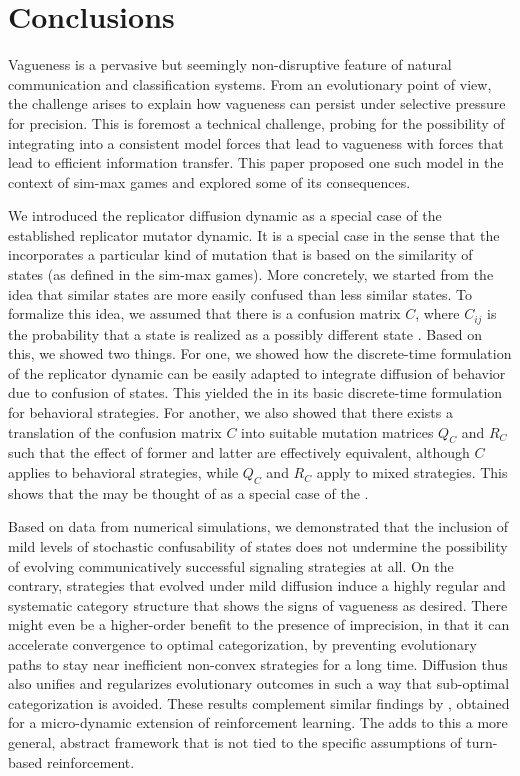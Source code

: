 \section{Conclusions}
\label{sec:conclusions}

Vagueness is a pervasive but seemingly non-disruptive feature of
natural communication and classification systems. From an evolutionary
point of view, the challenge arises to explain how vagueness can
persist under selective pressure for precision. This is foremost a
technical challenge, probing for the possibility of integrating into a
consistent model forces that lead to vagueness with forces that lead
to efficient information transfer. This paper proposed one such model
in the context of sim-max games and explored some of its consequences.

We introduced the replicator diffusion dynamic as a special case of
the established replicator mutator dynamic. It is a special case in
the sense that the \rdd incorporates a particular kind of mutation
that is based on the similarity of states (as defined in the sim-max
games). More concretely, we started from the idea that similar states
are more easily confused than less similar states. To formalize this
idea, we assumed that there is a confusion matrix $C$, where $C_{ij}$
is the probability that a state  is realized as a possibly
different state . Based on this, we showed two things. For
one, we showed how the discrete-time formulation of the replicator
dynamic can be easily adapted to integrate diffusion of behavior due
to confusion of states. This yielded the \rdd in its basic
discrete-time formulation for behavioral strategies. For another, we
also showed that there exists a translation of the confusion matrix
$C$ into suitable mutation matrices $Q_C$ and $R_C$ such that the
effect of former and latter are effectively equivalent, although $C$
applies to behavioral strategies, while $Q_C$ and $R_C$ apply to mixed
strategies. This shows that the \rdd may be thought of as a special
case of the \rmd.

Based on data from numerical simulations, we demonstrated that the
inclusion of mild levels of stochastic confusability of states does
not undermine the possibility of evolving communicatively successful
signaling strategies at all. On the contrary, strategies that evolved
under mild diffusion induce a highly regular and systematic category
structure that shows the signs of vagueness as desired. There might
even be a higher-order benefit to the presence of imprecision, in that
it can accelerate convergence to optimal categorization, by preventing
evolutionary paths to stay near inefficient non-convex strategies for
a long time. Diffusion thus also unifies and regularizes evolutionary
outcomes in such a way that sub-optimal categorization is
avoided. These results complement similar findings by
\citet{OConnor2013:The-Evolution-o}, obtained for a micro-dynamic
extension of reinforcement learning. The \rdd adds to this a more
general, abstract framework that is not tied to the specific
assumptions of turn-based reinforcement.

